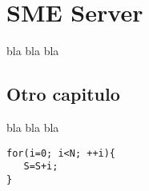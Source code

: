 \section{SME Server}
bla bla bla 
\subsection{Otro capitulo}
bla bla bla
\begin{verbatim}
for(i=0; i<N; ++i){
   S=S+i;
}
\end{verbatim}
